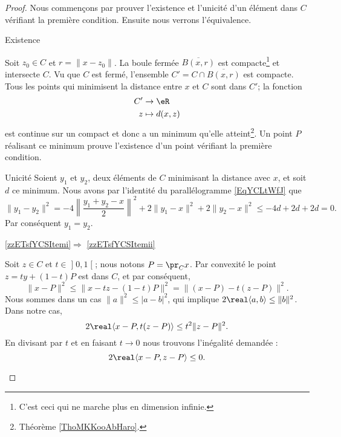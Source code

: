 \begin{proof}
    Nous commençons par prouver l'existence et l'unicité d'un élément dans \( C\) vérifiant la première condition. Ensuite nous verrons l'équivalence. 

    \begin{subproof}
        \item[Existence]
        
            Soit \( z_0\in C\) et \( r=\| x-z_0 \|\). La boule fermée \( \overline{ B(x,r) }\) est compacte\footnote{C'est ceci qui ne marche plus en dimension infinie.} et intersecte \( C\). Vu que \( C\) est fermé, l'ensemble \( C'=C\cap\overline{ B(x,r) }\) est compacte. Tous les points qui minimisent la distance entre \( x\) et \( C\) sont dans \( C'\); la fonction 
            \begin{equation}
                \begin{aligned}
                     C'&\to \eR \\
                    z&\mapsto d(x,z) 
                \end{aligned}
            \end{equation}
            est continue sur un compact et donc a un minimum qu'elle atteint\footnote{Théorème \ref{ThoMKKooAbHaro}.}. Un point \( P\) réalisant ce minimum prouve l'existence d'un point vérifiant la première condition.

        \item[Unicité]
            Soient \( y_1\) et \( y_2\), deux éléments de \( C\) minimisant la distance avec \( x\), et soit \( d\) ce minimum. Nous avons par l'identité du parallélogramme \eqref{EqYCLtWfJ} que
            \begin{equation}
                \| y_1-y_2 \|^2=-4\left\| \frac{ y_1+y_2-x }{2} \right\|^2+2\| y_1-x \|^2+2\| y_2-x \|^2\leq -4d+2d+2d=0.
            \end{equation}
            Par conséquent \( y_1=y_2\).

        \item[\ref{zzETsfYCSItemi}\( \Rightarrow\) \ref{zzETsfYCSItemii}]

            Soit \( z\in C\) et \( t\in \mathopen] 0 , 1 \mathclose[\); nous notons \( P=\pr_Cx\). Par convexité le point \( z=ty+(1-t)P\) est dans \( C\), et par conséquent,
                \begin{equation}
                    \| x-P \|^2\leq\| x-tz-(1-t)P \|^2=\| (x-P)-t(z-P) \|^2.
                \end{equation}
                Nous sommes dans un cas \( \| a \|^2\leq | a-b |^2\), qui implique \( 2\real\langle a, b\rangle \leq \| b \|^2\). Dans notre cas,
                \begin{equation}
                    2\real\langle x-P , t(z-P)\rangle \leq t^2\| z-P \|^2.
                \end{equation}
                En divisant par \( t\) et en faisant \( t\to 0\) nous trouvons l'inégalité demandée :
                \begin{equation}
                    2\real\langle x-P, z-P\rangle \leq 0.
                \end{equation}
                

\end{subproof}
\end{proof}
